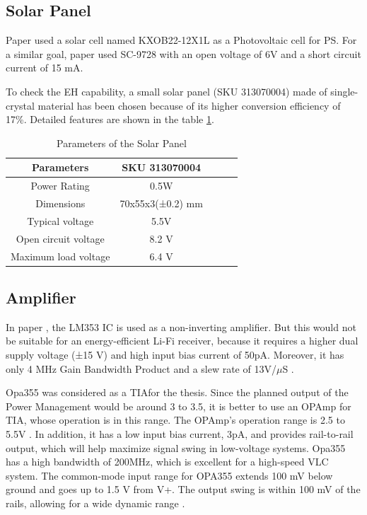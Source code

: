 \subsection{Solar Panel}
Paper \cite{fan2017circuit} used a solar cell named KXOB22-12X1L as a Photovoltaic cell for \ac{PS}. For a similar goal, paper \cite{wang2022high} used SC-9728 with an open voltage of 6V and a short circuit current of 15 mA.

To check the \ac{EH} capability, a small solar panel (SKU 313070004) made of single-crystal material has been chosen because of its higher conversion efficiency of 17\%. Detailed 
features are shown in the table \ref{tab:4.3}.

\begin{table}
    \centering
    \caption{Parameters of the Solar Panel}
    \begin{tabular}{|c|c|c|c|c|}
         \hline
         \textbf{Parameters} &\textbf{SKU 313070004}  \\
         \hline
         Power Rating  &0.5W   \\
         \hline
         Dimensions  &70x55x3(±0.2) mm  \\
         \hline
         Typical voltage  &5.5V  \\
         \hline
         Open circuit voltage  &8.2 V \\
         \hline
         Maximum load voltage &6.4 V  \\
         \hline
    \end{tabular}
    \label{tab:4.3}
\end{table}


\subsection{Amplifier}

In paper \cite{7420990}, the LM353 IC is used as a non-inverting amplifier. But this would not be suitable for an energy-efficient \ac{Li-Fi} receiver, because it requires a higher dual supply voltage (±15 V) and high input bias current of 50pA. Moreover, it has only 4 MHz Gain Bandwidth Product and a slew rate of 13V/\(\mu\)S \cite{LM353}.


Opa355 was considered as a \ac{TIA}for the thesis. Since the planned output of the Power Management would be around 3 to 3.5, it is better to use an \ac{OPAmp} for \ac{TIA}, whose operation is in this range. The \ac{OPAmp}'s operation range is 2.5 to 5.5V \cite{sbos195}. In addition, it has a low input bias current, 3pA, and provides rail-to-rail output, which will help maximize signal swing in low-voltage systems. Opa355 has a high bandwidth of 200MHz, which is excellent for a high-speed \ac{VLC} system. The common-mode input range for OPA355 extends 100 mV below ground and goes up to 1.5 V from V+. The output swing is within 100 mV of the rails, allowing for a wide dynamic range \cite{sbos195}.

